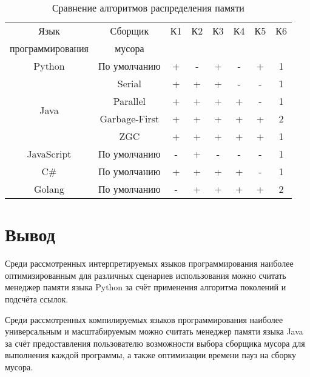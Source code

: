 \begin{table}[H]
	\centering
	\caption{Сравнение алгоритмов распределения памяти}
	\label{tab:compare}
	\begin{tabular}{|c|c|c|c|c|c|c|c|}
		\hline
		Язык & Сборщик & К1 & К2 & К3 & К4 & К5 & К6 \\
		программирования & мусора &  &  &  &  &  &  \\ \hline
		Python & По умолчанию 			& + & - & + & - & + & 1 \\ \hline
		\multirow{4}{*}{Java} & Serial 	& + & + & + & - & - & 1 \\ \cline{2-8}
		 & Parallel 					& + & + & + & + & - & 1 \\ \cline{2-8}
		 & Garbage-First 				& + & + & + & + & + & 2 \\ \cline{2-8}
		 & ZGC 							& + & + & + & + & + & 1 \\ \hline
		JavaScript & По умолчанию 		& - & + & - & - & - & 1 \\ \hline
		C\# & По умолчанию 				& + & + & + & + & - & 1 \\ \hline
		Golang & По умолчанию 			& - & + & + & + & + & 2 \\ \hline
	\end{tabular}
\end{table}



\section{Вывод}



Среди рассмотренных интерпретируемых языков программирования наиболее оптимизированным для различных сценариев использования можно считать менеджер памяти языка Python за счёт применения алгоритма поколений и подсчёта ссылок.

Среди рассмотренных компилируемых языков программирования наиболее универсальным и масштабируемым можно считать менеджер памяти языка Java за счёт предоставления пользователю возможности выбора сборщика мусора для выполнения каждой программы, а также оптимизации времени пауз на сборку мусора.
